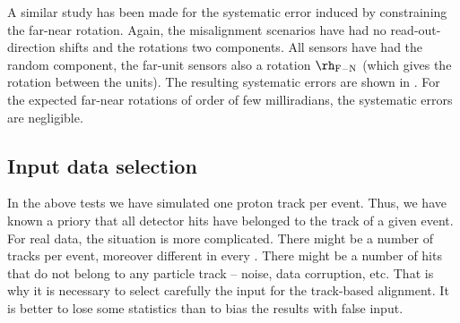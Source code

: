 
A similar study has been made for the systematic error induced by constraining the far-near rotation. Again, the misalignment scenarios have had no read-out-direction shifts and the rotations two components. All sensors have had the random component, the far-unit sensors also a rotation $\rh_{\rm F-N}$ (which gives the rotation between the units). The resulting systematic errors are shown in . For the expected far-near rotations of order of few milliradians, the systematic errors are negligible.


\eject %
\subsection[al data sel]{Input data selection}

In the above  tests we have simulated one proton track per event. Thus, we have known a priory that all detector hits have belonged to the track of a given event. For real  data, the situation is more complicated. There might be a number of tracks per event, moreover different in every . There might be a number of hits that do not belong to any particle track -- noise, data corruption, etc. That is why it is necessary to select carefully the input for the track-based alignment. It is better to lose some statistics than to bias the results with false input.

